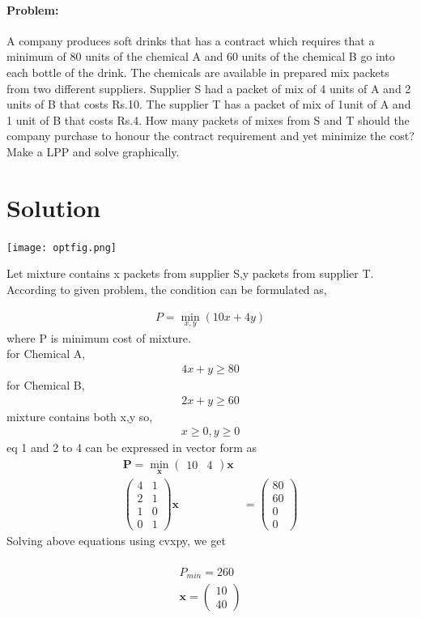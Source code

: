 \documentclass[10pt, a4paper]{article}
\title{\mytitle}
\author{\myauthor\hspace{1em}\\\contact\\IITH\hspace{0.5em}-\hspace{0.5em}\mymodule}
\date{}
\newcommand{\myvec}[1]{\ensuremath{\begin{pmatrix}#1\end{pmatrix}}}
\let\vec\mathbf
\begin{document}
	\maketitle
\paragraph{Problem:}
A company produces soft drinks that has a contract which requires that a minimum of 80 units of the chemical A and 60 units of the chemical B go into each bottle of the drink. The chemicals are available in prepared mix packets from two different suppliers. Supplier S had a packet of mix of 4 units of A and 2 units of B that costs Rs.10. The supplier T has a packet of mix of 1unit of A and 1 unit of B that costs Rs.4. How many packets of mixes from S and T should the company purchase to honour the contract requirement and yet minimize the cost? Make a LPP and solve graphically.
\section*{Solution} 
\texttt{[image: optfig.png]} 
\begin{flushleft}
Let mixture contains x packets from supplier S,y packets from supplier T.\\
According to given problem, the condition can be formulated as,\\
\end{flushleft}
\begin{align}
P=\min_{x,y}(10x+4y)
\end{align}
where P is minimum cost of mixture.\\
for Chemical A,
\begin{align}
4x+y \geq80
\end{align}
for Chemical B,
\begin{align}
2x+y \geq 60
\end{align}
mixture contains both x,y so,
\begin{align}
x\geq0,y\geq0
\end{align}
eq 1 and 2 to 4 can be expressed in vector form as
\begin{align}
\vec{P}=\min_{\vec{x}}\myvec{10 &4}\vec{x}\\
\myvec{4 & 1\\
       2 & 1\\
       1 &0\\
       0 & 1}\vec{x}&= \myvec{80 \\60\\0\\0}
\end{align}
Solving above equations using cvxpy, we get\\
\vspace{0.1cm}\\
\begin{align}
P_{min}=260\\
\vec{x}=\myvec{10\\40}
\end{align}
\end{document}
